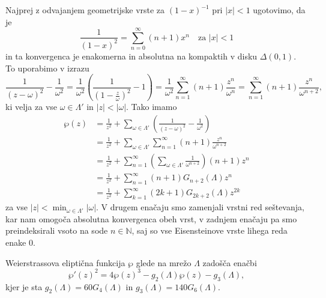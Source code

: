 \documentclass[mat1]{fmfdelo}
\numberwithin{equation}{section}
\newcommand{\N}{\mathbb N}
\newcommand{\om}{\omega}
\newcommand{\abs}[1]{\left\lvert #1 \right\rvert}
\newcommand{\disk}[2]{\Delta(#1, #2)}
\theoremstyle{definition}
\begin{document}
\begin{dokaz}
    Najprej z odvajanjem geometrijske vrste za $(1 - x)^{-1}$ pri $\abs{x} < 1$ ugotovimo, da je 
    \[
        \frac{1}{(1 - x)^2} = \sum_{n = 0}^\infty (n + 1) x^n \quad \text{za $\abs{x} < 1$}  
    \]
    in ta konvergenca je enakomerna in absolutna na kompaktih v disku $\disk{0}{1}$. To uporabimo v izrazu
    \[
        \frac{1}{(z - \om)^2} - \frac{1}{\om^2} = 
        \frac{1}{\om^2}\left(\frac{1}{(1 - \frac{z}{\om})^2} - 1\right) = 
        \frac{1}{\om^2} \sum_{n = 1}^\infty (n + 1)\frac{z^n}{\om^{n}} = 
        \sum_{n = 1}^\infty (n + 1)\frac{z^n}{\om^{n + 2}}, 
    \]
    ki velja za vse $\om\in\Lambda'$ in $\abs{z} < \abs{\om}$. Tako imamo
    \begin{align*}
        \wp(z) &= 
        \frac{1}{z^2} + \sum_{\om\in\Lambda'}\left(\frac{1}{(z-\om)^2} - \frac{1}{\om^2}\right) \\
        &= \frac{1}{z^2} + \sum_{\om\in\Lambda'}\sum_{n = 1}^\infty (n + 1)\frac{z^n}{\om^{n + 2}} \\
        &= \frac{1}{z^2} + \sum_{n = 1}^\infty \left( \sum_{\om\in\Lambda'} \frac{1}{\om^{n + 2}} \right) (n + 1) z^n \\
        &= \frac{1}{z^2} + \sum_{n = 1}^\infty (n + 1) G_{n + 2}(\Lambda) z^n \\
        &= \frac{1}{z^2} + \sum_{k = 1}^\infty (2k + 1) G_{2k + 2}(\Lambda) z^{2k}
    \end{align*}
    za vse $\abs{z} < \min_{\om\in\Lambda'}\abs{\om}$. V drugem enačaju smo zamenjali vrstni red seštevanja, kar nam omogoča absolutna konvergenca obeh vrst, v zadnjem enačaju pa smo preindeksirali vsoto na sode $n\in \N$, saj so vse Eisensteinove vrste lihega reda enake $0$. 
\end{dokaz}

\begin{izrek}
    \label{ode za wp}
    Weierstrassova eliptična funkcija $\wp$ glede na mrežo $\Lambda$ zadošča enačbi
    \begin{equation}
        \label{wp identiteta}
        \wp'(z)^2 = 4\wp(z)^3 - g_2(\Lambda)\wp(z) - g_3(\Lambda),
    \end{equation}
    kjer je sta $g_2(\Lambda) = 60G_4(\Lambda)$ in $g_3(\Lambda) = 140G_6(\Lambda)$.
\end{izrek}
\end{document}

